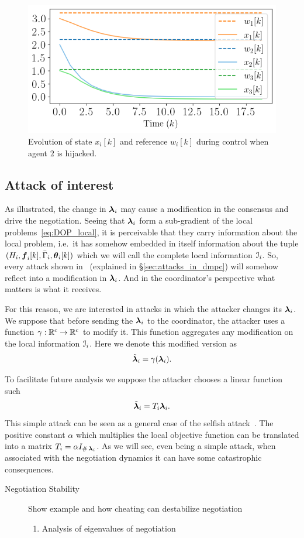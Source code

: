 \documentclass[../main.tex]{subfiles}
\begin{document}
\begin{figure}[h]
  \centering
  \includegraphics[width=.5\textwidth]{../img/example_liar_state.png}
  \caption{Evolution of state $x_{i}[k]$ and reference $w_{i}[k]$ during control when agent $2$ is hijacked. }\label{fig:example_liar_state}
\end{figure}

\subsection{Attack of interest}\label{sec:attack-interest}

As illustrated, the change in $\boldsymbol{\lambda}_i$ may cause a modification in the consensus and drive the negotiation.
Seeing that $\boldsymbol{\lambda}_i$ form a sub-gradient of the local problems~\eqref{eq:DOP_local}, it is perceivable that they carry information about the local problem, i.e.\ it has somehow embedded in itself information about the tuple $(H_{i},\vec{f}_{i}[k],\bar{\Gamma}_{i},\thetaik)$ which we will call the complete local information $\mathcal{I}_{i}$.
So, every attack shown in~\cite{VelardeEtAl2018} (explained in \S\ref{sec:attacks_in_dmpc}) will somehow reflect into a modification in $\boldsymbol{\lambda}_i$.
And in the coordinator's perspective what matters is what it receives.

For this reason, we are interested in \fdi{} attacks in which the attacker changes its $\boldsymbol{\lambda}_i$.
We suppose that before sending the $\boldsymbol{\lambda}_i$ to the coordinator, the attacker uses a function ${\gamma:\mathbb{R}^{c}\to \mathbb{R}^{c}}$  to modify it.
This function aggregates any modification on the local information $\mathcal{I}_{i}$.
Here we denote this modified version as
\begin{equation}
  \tilde{\boldsymbol{\lambda}}_{i}=\gamma(\boldsymbol{\lambda}_i).
\end{equation}

To facilitate future analysis we suppose the attacker chooses a linear function such
\begin{equation}
  \label{eq:linear_attack}
  \tilde{\boldsymbol{\lambda}}_{i}=T_{i}\boldsymbol{\lambda}_i.
\end{equation}
This simple attack can be seen as a general case of the selfish attack~\cite{VelardeEtAl2018}.
The positive constant $\alpha$ which multiplies the local objective function can be translated into a matrix $T_{i}=\alpha I_{\operatorname{\#}{\boldsymbol{\lambda}_i}}$.
As we will see, even being a simple attack, when associated with the negotiation dynamics it can have some catastrophic consequences.

\begin{description}
  \item[Negotiation Stability] Show example and how cheating can destabilize negotiation
        \begin{enumerate}
          \item Analysis of eigenvalues of negotiation
        \end{enumerate}
\end{description}
\end{document}
